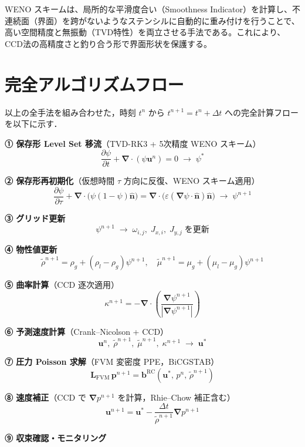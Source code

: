 \documentclass[12pt, a4paper, titlepage, xelatex, ja=standard]{bxjsarticle}
\newcommand{\pd}[2]{\dfrac{\partial #1}{\partial #2}}
\newcommand{\bu}{\bm{u}}
\newcommand{\bnabla}{\bm{\nabla}}
\begin{document}
WENO スキームは、局所的な平滑度合い（Smoothness Indicator）を計算し、不連続面（界面）を跨がないようなステンシルに自動的に重み付けを行うことで、高い空間精度と無振動（TVD特性）を両立させる手法である。これにより、CCD法の高精度さと釣り合う形で界面形状を保護する。


\section{完全アルゴリズムフロー}
\label{sec:algorithm}

以上の全手法を組み合わせた，時刻 $t^n$ から $t^{n+1} = t^n + \Delta t$ への完全計算フローを以下に示す．

\begin{tcolorbox}[algbox, title={時刻 $t^n \to t^{n+1}$ の完全計算フロー（9段階）}]

\textbf{① 保存形 Level Set 移流}（TVD-RK3 + 5次精度 WENO スキーム）
\[
  \pd{\psi}{t} + \bnabla\cdot(\psi\bu^n) = 0 \;\longrightarrow\; \psi^*
\]

\textbf{② 保存形再初期化}（仮想時間 $\tau$ 方向に反復、WENO スキーム適用）
\[
  \pd{\psi}{\tau} + \bnabla\cdot\bigl(\psi(1-\psi)\hat{\bm{n}}\bigr) = \bnabla\cdot\bigl(\varepsilon(\bnabla\psi\cdot\hat{\bm{n}})\hat{\bm{n}}\bigr) \;\longrightarrow\; \psi^{n+1}
\]

\textbf{③ グリッド更新}
\[
  \psi^{n+1} \;\longrightarrow\; \omega_{i,j},\; J_{x,i},\; J_{y,j} \;\text{を更新}
\]

\textbf{④ 物性値更新}
\[
  \tilde\rho^{n+1} = \rho_g + (\rho_l - \rho_g)\psi^{n+1},\quad \tilde\mu^{n+1} = \mu_g + (\mu_l - \mu_g)\psi^{n+1}
\]

\textbf{⑤ 曲率計算}（CCD 逐次適用）
\[
  \kappa^{n+1} = -\bnabla \cdot \left( \frac{\bnabla\psi^{n+1}}{|\bnabla\psi^{n+1}|} \right)
\]

\textbf{⑥ 予測速度計算}（Crank--Nicolson + CCD）
\[
  \bu^n,\;\tilde\rho^{n+1},\;\tilde\mu^{n+1},\;\kappa^{n+1} \;\longrightarrow\; \bu^*
\]

\textbf{⑦ 圧力 Poisson 求解}（FVM 変密度 PPE，BiCGSTAB）
\[
  \bm{L}_{\mathrm{FVM}}\,\bm{p}^{n+1} = \bm{b}^{\mathrm{RC}}(\bu^*,\,p^n,\,\tilde\rho^{n+1})
\]

\textbf{⑧ 速度補正}（CCD で $\bnabla p^{n+1}$ を計算，Rhie--Chow 補正含む）
\[
  \bu^{n+1} = \bu^* - \frac{\Delta t}{\tilde\rho^{n+1}}\bnabla p^{n+1}
\]

\textbf{⑨ 収束確認・モニタリング}

\end{tcolorbox}
\end{document}
